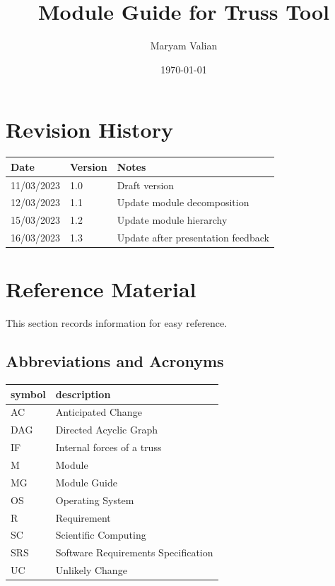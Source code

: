 \documentclass[12pt, titlepage]{article}
\begin{document}
\title{Module Guide for Truss Tool} 
\author{Maryam Valian}
\date{\today}

\maketitle


\section{Revision History}

\begin{tabularx}{\textwidth}{p{3cm}p{2cm}X}
\toprule {\bf Date} & {\bf Version} & {\bf Notes}\\
\midrule
11/03/2023 & 1.0 & Draft version\\
12/03/2023 & 1.1 & Update module decomposition\\
15/03/2023 &1.2 & Update module hierarchy\\
16/03/2023 &1.3 & Update after presentation feedback\\
\bottomrule
\end{tabularx}

\newpage

\section{Reference Material}

This section records information for easy reference.

\subsection{Abbreviations and Acronyms}

\renewcommand{\arraystretch}{1.2}
\begin{tabular}{l l} 
  \toprule		
  \textbf{symbol} & \textbf{description}\\
  \midrule 
  AC & Anticipated Change\\
  DAG & Directed Acyclic Graph \\
  IF & Internal forces of a truss\\
  M & Module \\
  MG & Module Guide \\
  OS & Operating System \\
  R & Requirement\\
  SC & Scientific Computing \\
  SRS & Software Requirements Specification\\
  
  UC & Unlikely Change \\
  
  \bottomrule
\end{tabular}\\
\end{document}
